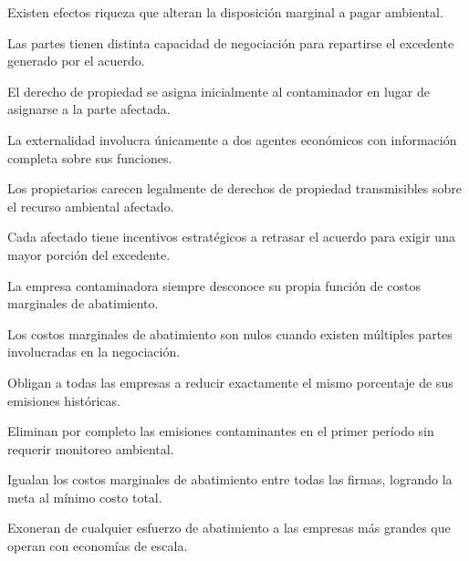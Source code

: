 \begin{opts}
    \item Existen efectos riqueza que alteran la disposición marginal a pagar ambiental.
    \item Las partes tienen distinta capacidad de negociación para repartirse el excedente generado por el acuerdo.
    \item El derecho de propiedad se asigna inicialmente al contaminador en lugar de asignarse a la parte afectada.
    \item La externalidad involucra únicamente a dos agentes económicos con información completa sobre sus funciones.
\end{opts}

\begin{opts}
    \item Los propietarios carecen legalmente de derechos de propiedad transmisibles sobre el recurso ambiental afectado.
    \item Cada afectado tiene incentivos estratégicos a retrasar el acuerdo para exigir una mayor porción del excedente.
    \item La empresa contaminadora siempre desconoce su propia función de costos marginales de abatimiento.
    \item Los costos marginales de abatimiento son nulos cuando existen múltiples partes involucradas en la negociación.
\end{opts}

\begin{opts}
    \item Obligan a todas las empresas a reducir exactamente el mismo porcentaje de sus emisiones históricas.
    \item Eliminan por completo las emisiones contaminantes en el primer período sin requerir monitoreo ambiental.
    \item Igualan los costos marginales de abatimiento entre todas las firmas, logrando la meta al mínimo costo total.
    \item Exoneran de cualquier esfuerzo de abatimiento a las empresas más grandes que operan con economías de escala.
\end{opts}

